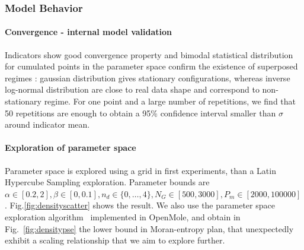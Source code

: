 \subsubsection{Model Behavior}


\paragraph{Convergence - internal model validation}


Indicators show good convergence property and bimodal statistical distribution for cumulated points in the parameter space confirm the existence of superposed regimes : gaussian distribution gives stationary configurations, whereas inverse log-normal distribution are close to real data shape and correspond to non-stationary regime. For one point and a large number of repetitions, we find that 50 repetitions are enough to obtain a 95\% confidence interval smaller than $\sigma$ around indicator mean. 

\paragraph{Exploration of parameter space}


Parameter space is explored using a grid in first experiments, than a Latin Hypercube Sampling exploration. Parameter bounds are $\alpha \in [0.2,2],\beta \in [0,0.1],n_d \in \{0,\ldots , 4\}, N_G \in [500,3000], P_m \in [2000,100000]$. Fig.\ref{fig:densityscatter} shows the result. We also use the parameter space exploration algorithm~\cite{10.1371/journal.pone.0138212} implemented in OpenMole, and obtain in Fig.~\ref{fig:densitypse} the lower bound in Moran-entropy plan, that unexpectedly exhibit a scaling relationship that we aim to explore further.


